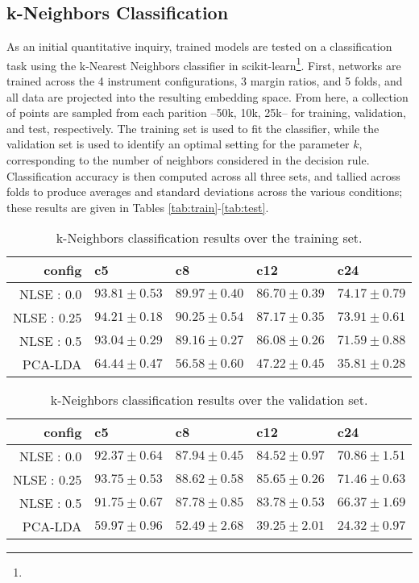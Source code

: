 \subsection{k-Neighbors Classification}

As an initial quantitative inquiry, trained models are tested on a classification task using the k-Nearest Neighbors classifier in scikit-learn\footnote{}.
First, networks are trained across the 4 instrument configurations, 3 margin ratios, and 5 folds, and all data are projected into the resulting embedding space.
From here, a collection of points are sampled from each parition --50k, 10k, 25k-- for training, validation, and test, respectively.
The training set is used to fit the classifier, while the validation set is used to identify an optimal setting for the parameter $k$, corresponding to the number of neighbors considered in the decision rule.
Classification accuracy is then computed across all three sets, and tallied across folds to produce averages and standard deviations across the various conditions; these results are given in Tables \ref{tab:train}-\ref{tab:test}.


\begin{table*}[h]
\begin{center}
\caption{k-Neighbors classification results over the training set.}
\small
\begin{tabular}{rllll}
 config  & c5    & c8   & c12  & c24  \\
\hline
 NLSE : 0.0  & $93.81\pm0.53$ & $89.97\pm0.40$ & $86.70\pm0.39$ & $74.17\pm0.79$ \\
 NLSE : 0.25 & $94.21\pm0.18$ & $90.25\pm0.54$ & $87.17\pm0.35$ & $73.91\pm0.61$ \\
 NLSE : 0.5  & $93.04\pm0.29$ & $89.16\pm0.27$ & $86.08\pm0.26$ & $71.59\pm0.88$ \\
 \hline
 PCA-LDA & $64.44\pm0.47$ & $56.58\pm0.60$ & $47.22\pm0.45$ & $35.81\pm0.28$ \\

\hline
\end{tabular}
\label{tab:things}
\end{center}
\end{table*}

\begin{table*}[h]
\begin{center}
\caption{k-Neighbors classification results over the validation set.}
\small
\begin{tabular}{rllll}
\hline
config & c5  & c8 & c12   & c24     \\
\hline
 NLSE : 0.0  & $92.37\pm0.64$ & $87.94\pm0.45$ & $84.52\pm0.97$ & $70.86\pm1.51$ \\
 NLSE : 0.25 & $93.75\pm0.53$ & $88.62\pm0.58$ & $85.65\pm0.26$ & $71.46\pm0.63$ \\
 NLSE : 0.5  & $91.75\pm0.67$ & $87.78\pm0.85$ & $83.78\pm0.53$ & $66.37\pm1.69$ \\
 \hline
 PCA-LDA & $59.97\pm0.96$ & $52.49\pm2.68$ & $39.25\pm2.01$ & $24.32\pm0.97$ \\
\hline
\end{tabular}
\label{tab:things}
\end{center}
\end{table*}

